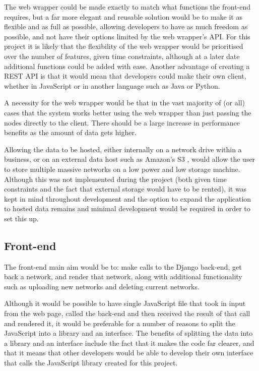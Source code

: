 \documentclass[../dissertation.tex]{subfiles}
\begin{document}
The web wrapper could be made exactly to match what functions the front-end requires, but a far more elegant and reusable solution would be to make it as flexible and as full as possible, allowing developers to have as much freedom as possible, and not have their options limited by the web wrapper's API. For this project it is likely that the flexibility of the web wrapper would be prioritised over the number of features, given time constraints, although at a later date additional functions could be added with ease. Another advantage of creating a REST API is that it would mean that developers could make their own client, whether in JavaScript or in another language such as Java or Python.

A necessity for the web wrapper would be that in the vast majority of (or all) cases that the system works better using the web wrapper than just passing the nodes directly to the client. There should be a large increase in performance benefits as the amount of data gets higher.

Allowing the data to be hosted, either internally on a network drive within a business, or on an external data host such as Amazon's S3 \cite{amazons3}, would allow the user to store multiple massive networks on a low power and low storage machine. Although this was not implemented during the project (both given time constraints and the fact that external storage would have to be rented), it was kept in mind throughout development and the option to expand the application to hosted data remains and minimal development would be required in order to set this up.

\subsection{Front-end}

The front-end main aim would be to: make calls to the Django back-end, get back a network, and render that network, along with additional functionality such as uploading new networks and deleting current networks. 

Although it would be possible to have single JavaScript file that took in input from the web page, called the back-end and then received the result of that call and rendered it, it would be preferable for a number of reasons to split the JavaScript into a library and an interface. The benefits of splitting the data into a library and an interface include the fact that it makes the code far clearer, and that it means that other developers would be able to develop their own interface that calls the JavaScript library created for this project.
\end{document}
